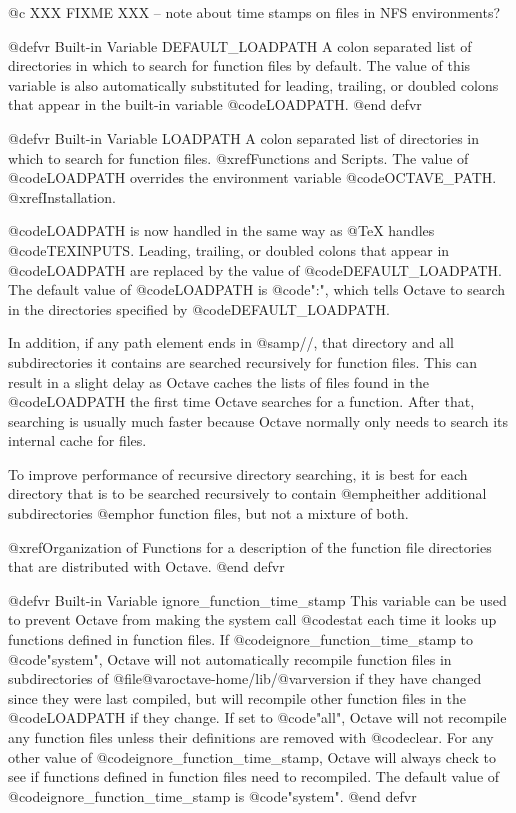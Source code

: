 @c XXX FIXME XXX -- note about time stamps on files in NFS environments?

@defvr {Built-in Variable} DEFAULT_LOADPATH
A colon separated list of directories in which to search for function
files by default.  The value of this variable is also automatically
substituted for leading, trailing, or doubled colons that appear in the
built-in variable @code{LOADPATH}.
@end defvr

@defvr {Built-in Variable} LOADPATH
A colon separated list of directories in which to search for function
files.  @xref{Functions and Scripts}.  The value of @code{LOADPATH}
overrides the environment variable @code{OCTAVE_PATH}.  @xref{Installation}.

@code{LOADPATH} is now handled in the same way as @TeX{} handles
@code{TEXINPUTS}.  Leading, trailing, or doubled colons that appear in
@code{LOADPATH} are replaced by the value of @code{DEFAULT_LOADPATH}.
The default value of @code{LOADPATH} is @code{":"}, which tells Octave
to search in the directories specified by @code{DEFAULT_LOADPATH}.

In addition, if any path element ends in @samp{//}, that directory and
all subdirectories it contains are searched recursively for function
files.  This can result in a slight delay as Octave caches the lists of
files found in the @code{LOADPATH} the first time Octave searches for a
function.  After that, searching is usually much faster because Octave
normally only needs to search its internal cache for files.

To improve performance of recursive directory searching, it is best for
each directory that is to be searched recursively to contain
@emph{either} additional subdirectories @emph{or} function files, but
not a mixture of both.

@xref{Organization of Functions} for a description of the function file
directories that are distributed with Octave.
@end defvr

@defvr {Built-in Variable} ignore_function_time_stamp
This variable can be used to prevent Octave from making the system call
@code{stat} each time it looks up functions defined in function files.
If @code{ignore_function_time_stamp} to @code{"system"}, Octave will not
automatically recompile function files in subdirectories of
@file{@var{octave-home}/lib/@var{version}} if they have changed since
they were last compiled, but will recompile other function files in the
@code{LOADPATH} if they change.  If set to @code{"all"}, Octave will not
recompile any function files unless their definitions are removed with
@code{clear}.  For any other value of @code{ignore_function_time_stamp},
Octave will always check to see if functions defined in function files
need to recompiled.  The default value of @code{ignore_function_time_stamp} is
@code{"system"}.
@end defvr

